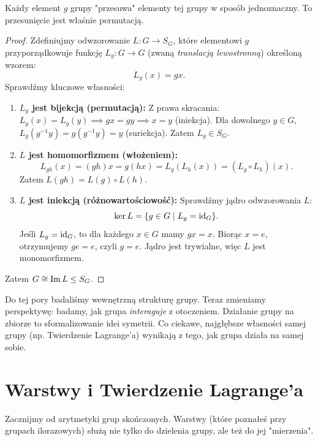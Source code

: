 \begin{intuition}
Każdy element $g$ grupy "przesuwa" elementy tej grupy w sposób jednoznaczny. To przesunięcie jest właśnie permutacją.
\end{intuition}

\begin{proof}
Zdefiniujmy odwzorowanie $L: G \to S_G$, które elementowi $g$ przyporządkowuje funkcję $L_g: G \to G$ (zwaną \textit{translacją lewostronną}) określoną wzorem:
\[ L_g(x) = gx. \]
Sprawdźmy kluczowe własności:
\begin{enumerate}
    \item \textbf{$L_g$ jest bijekcją (permutacją):}
    Z prawa skracania: $L_g(x) = L_g(y) \implies gx = gy \implies x=y$ (iniekcja).
    Dla dowolnego $y \in G$, $L_g(g^{-1}y) = g(g^{-1}y) = y$ (suriekcja).
    Zatem $L_g \in S_G$.

    \item \textbf{$L$ jest homomorfizmem (włożeniem):}
    \[ L_{gh}(x) = (gh)x = g(hx) = L_g(L_h(x)) = (L_g \circ L_h)(x). \]
    Zatem $L(gh) = L(g) \circ L(h)$.

    \item \textbf{$L$ jest iniekcją (różnowartościowość):}
    Sprawdźmy jądro odwzorowania $L$:
    \[ \ker L = \{ g \in G \mid L_g = \operatorname{id}_G \}. \]
    Jeśli $L_g = \operatorname{id}_G$, to dla każdego $x \in G$ mamy $gx = x$. Biorąc $x=e$, otrzymujemy $ge = e$, czyli $g=e$.
    Jądro jest trywialne, więc $L$ jest monomorfizmem.
\end{enumerate}
Zatem $G \cong \operatorname{Im} L \le S_G$.
\end{proof}



\begin{intuition}
Do tej pory badaliśmy wewnętrzną strukturę grupy. Teraz zmieniamy perspektywę: badamy, jak grupa \textit{interaguje} z otoczeniem. Działanie grupy na zbiorze to sformalizowanie idei symetrii. Co ciekawe, najgłębsze własności samej grupy (np. Twierdzenie Lagrange'a) wynikają z tego, jak grupa działa na samej sobie.
\end{intuition}

\section{Warstwy i Twierdzenie Lagrange'a}

Zacznijmy od arytmetyki grup skończonych. Warstwy (które poznałeś przy grupach ilorazowych) służą nie tylko do dzielenia grupy, ale też do jej "mierzenia".

